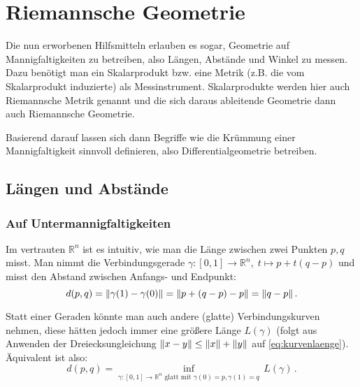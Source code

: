 \documentclass[../H_Analysis_main.tex]{subfiles}
\begin{document}
\setcounter{chapter}{6}

\chapter{Riemannsche Geometrie}
\begin{center}
Die nun erworbenen Hilfsmitteln erlauben es sogar, Geometrie auf Mannigfaltigkeiten zu betreiben, also Längen, Abstände und Winkel zu messen. Dazu benötigt man ein Skalarprodukt bzw. eine Metrik (z.B. die vom Skalarprodukt induzierte) als Messinstrument. Skalarprodukte werden hier auch Riemannsche Metrik genannt und die sich daraus ableitende Geometrie dann auch Riemannsche Geometrie.

Basierend darauf lassen sich dann Begriffe wie die Krümmung einer Mannigfaltigkeit sinnvoll definieren, also Differentialgeometrie betreiben.
\end{center}



\newpage


	\section{Längen und Abstände}%
		\subsection{Auf Untermannigfaltigkeiten}%
Im vertrauten $\mathbb{R}^n$ ist es intuitiv, wie man die Länge zwischen zwei Punkten $p, q$ misst. Man nimmt die Verbindungsgerade $\gamma: [0, 1] \rightarrow \mathbb{R}^n, \; t \mapsto p + t (q - p)$ und misst den Abstand zwischen Anfangs- und Endpunkt:
\begin{equation}
d(p, q) = \norm{\gamma(1) - \gamma(0)} = \norm{p + (q - p) - p} = \norm{q - p} \, .
\end{equation}

Statt einer Geraden könnte man auch andere (glatte) Verbindungskurven nehmen, diese hätten jedoch immer eine größere Länge $L(\gamma)$ (folgt aus Anwenden der Dreiecksungleichung $\norm{x - y} \leq \norm{x} + \norm{y}$ auf \eqref{eq:kurvenlaenge}). Äquivalent ist also:
\begin{equation}\label{eq:metrik_kurve}
d(p, q) = \inf_{\gamma: [0, 1] \rightarrow \mathbb{R}^n \text{ glatt mit } \gamma(0) = p, \gamma(1) = q} \, L(\gamma) \, .
\end{equation}
\end{document}
